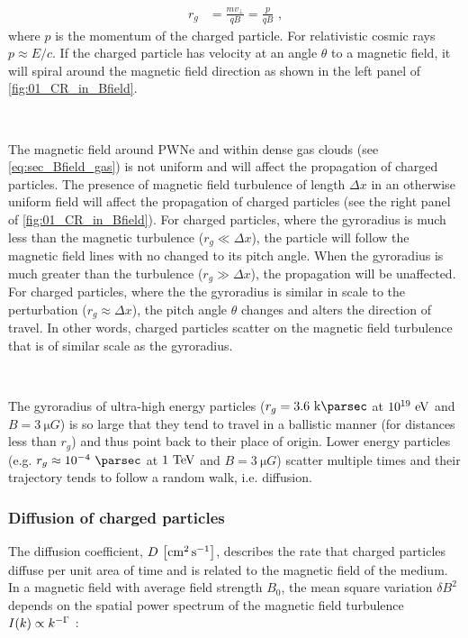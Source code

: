 \begin{equation}
    \begin{aligned}
    r_g&=\frac{mv_\perp}{qB}=\frac{p}{qB}\text{ ,}
    \end{aligned} \label{eq:chapter_1_gyroradius}
\end{equation}
\noindent where $p$ is the momentum of the charged particle. For relativistic cosmic rays $p\approx E/c$. If the charged particle has velocity at an angle $\theta$ to a magnetic field, it will spiral around the magnetic field direction as shown in the left panel of \autoref{fig:01_CR_in_Bfield}.
\par~\par 
The magnetic field around PWNe and within dense gas clouds (see \autoref{eq:sec_Bfield_gas}) is not uniform and will affect the propagation of charged particles. The presence of magnetic field turbulence of length $\Delta x$ in an otherwise uniform field will affect the propagation of charged particles (see the right panel of \autoref{fig:01_CR_in_Bfield}). For charged particles, where the gyroradius is much less than the magnetic turbulence ($r_g\ll \Delta x$), the particle will follow the magnetic field lines with no changed to its pitch angle. When the gyroradius is much greater than the turbulence ($r_g\gg \Delta x$), the propagation will be unaffected. For charged particles, where the the gyroradius is similar in scale to the perturbation ($r_g\approx \Delta x$), the pitch angle $\theta$ changes and alters the direction of travel. In other words, charged particles scatter on the magnetic field turbulence that is of similar scale as the gyroradius.
\par~\par
The gyroradius of ultra-high energy particles ($r_g=3.6~\kpc$ at $10^{19}~\si{\electronvolt}$ and $B=3~\si{\micro G}$) is so large that they tend to travel in a ballistic manner (for distances less than $r_g$) and thus point back to their place of origin. Lower energy particles (e.g. $r_g\approx 10^{-4}~\pc$ at $1~\TeV$ and $B=3~\si{\micro G}$) scatter multiple times and their trajectory tends to follow a random walk, i.e. diffusion.

\subsubsection{Diffusion of charged particles} 

The diffusion coefficient, $D~\qty[\si{\centi\meter\squared\per\second}]$, describes the rate that charged particles diffuse per unit area of time and is related to the magnetic field of the medium. In a magnetic field with average field strength $B_0$, the mean square variation $\delta B^2$ depends on the spatial power spectrum of the magnetic field turbulence $I\qty(k)\propto k^{-\Gamma}$ \citep{1983RPPh...46..973D,2016MNRAS.461.3552N}:


